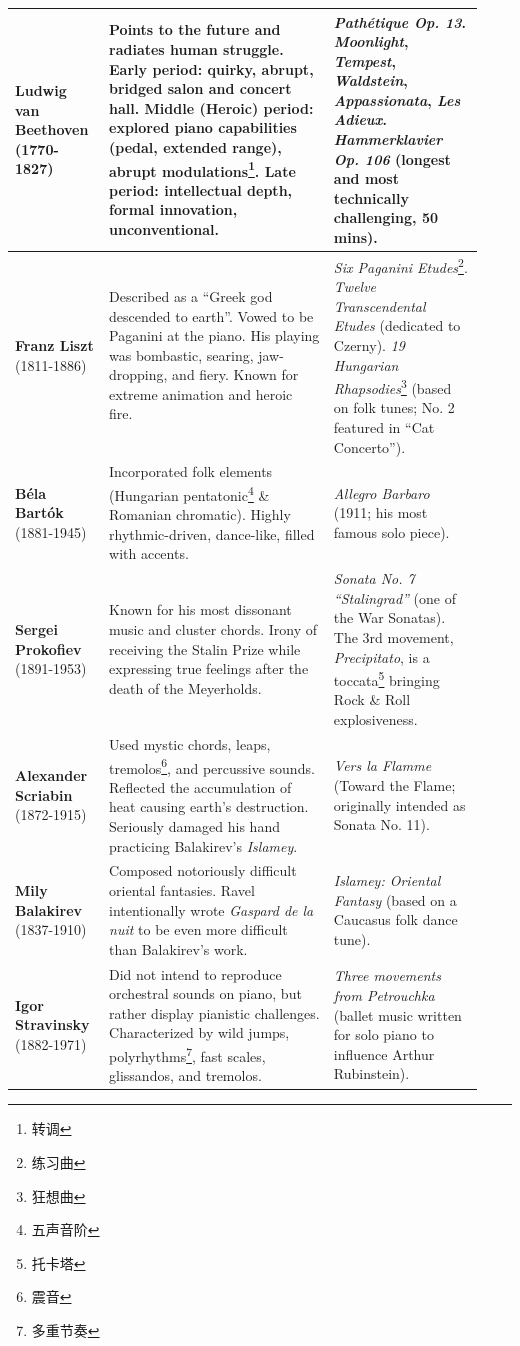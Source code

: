 \documentclass[math,code]{amznotes}
\theoremstyle{remark}
\begin{document}
\begin{longtable}{|p{0.18\linewidth}|p{0.45\linewidth}|p{0.3\linewidth}|}
\hline
\textbf{Ludwig van Beethoven} (1770-1827) & Points to the future and radiates human struggle. Early period: quirky, abrupt, bridged salon and concert hall. Middle (Heroic) period: explored piano capabilities (pedal, extended range), abrupt modulations\footnote{转调}. Late period: intellectual depth, formal innovation, unconventional. & \textit{Pathétique Op. 13}. \textit{Moonlight}, \textit{Tempest}, \textit{Waldstein}, \textit{Appassionata}, \textit{Les Adieux}. \textit{Hammerklavier Op. 106} (longest and most technically challenging, 50 mins). \\
\hline
\textbf{Franz Liszt} (1811-1886) & Described as a ``Greek god descended to earth''. Vowed to be Paganini at the piano. His playing was bombastic, searing, jaw-dropping, and fiery. Known for extreme animation and heroic fire. & \textit{Six Paganini Etudes}\footnote{练习曲}. \textit{Twelve Transcendental Etudes} (dedicated to Czerny). \textit{19 Hungarian Rhapsodies}\footnote{狂想曲} (based on folk tunes; No. 2 featured in ``Cat Concerto''). \\
\hline
\textbf{Béla Bartók} (1881-1945) & Incorporated folk elements (Hungarian pentatonic\footnote{五声音阶} \& Romanian chromatic). Highly rhythmic-driven, dance-like, filled with accents. & \textit{Allegro Barbaro} (1911; his most famous solo piece). \\
\hline
\textbf{Sergei Prokofiev} (1891-1953) & Known for his most dissonant music and cluster chords. Irony of receiving the Stalin Prize while expressing true feelings after the death of the Meyerholds. & \textit{Sonata No. 7 ``Stalingrad''} (one of the War Sonatas). The 3rd movement, \textit{Precipitato}, is a toccata\footnote{托卡塔} bringing Rock \& Roll explosiveness. \\
\hline
\textbf{Alexander Scriabin} (1872-1915) & Used mystic chords, leaps, tremolos\footnote{震音}, and percussive sounds. Reflected the accumulation of heat causing earth's destruction. Seriously damaged his hand practicing Balakirev's \textit{Islamey}. & \textit{Vers la Flamme} (Toward the Flame; originally intended as Sonata No. 11). \\
\hline
\textbf{Mily Balakirev} (1837-1910) & Composed notoriously difficult oriental fantasies. Ravel intentionally wrote \textit{Gaspard de la nuit} to be even more difficult than Balakirev's work. & \textit{Islamey: Oriental Fantasy} (based on a Caucasus folk dance tune). \\
\hline
\textbf{Igor Stravinsky} (1882-1971) & Did not intend to reproduce orchestral sounds on piano, but rather display pianistic challenges. Characterized by wild jumps, polyrhythms\footnote{多重节奏}, fast scales, glissandos, and tremolos. & \textit{Three movements from Petrouchka} (ballet music written for solo piano to influence Arthur Rubinstein). \\
\hline

\end{longtable}
\end{document}
